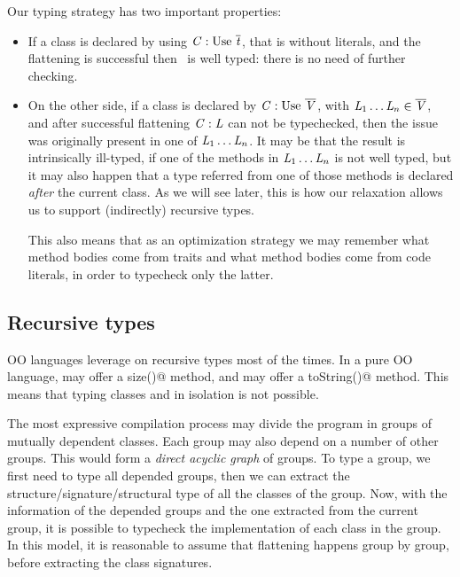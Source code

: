 Our typing strategy has two important properties:
\begin{itemize}
\item If a class is declared by using $\mC : \use\ \overline\mt$, that is without literals,
and the flattening is successful then \mC\ is well typed: there is no need of further checking.
\item On the other side, if a class is declared by $\mC : \use\ \overline\mV$, with
$\mathit{L}_1\ldots\mathit{L}_n \in \overline{\mathit{V}}$, and after successful flattening $\mathit{C} : \mathit{L}$ can not be typechecked,
then the issue was originally present in one of $\mathit{L}_1\ldots\mathit{L}_n$.
It may be that the result is intrinsically ill-typed, if one of the methods in $\mathit{L}_1\ldots\mathit{L}_n$ is not well typed,
but it may also happen that a type referred from one of those methods
is declared \emph{after} the current class. As we will see later, this
is how our relaxation allows us to support (indirectly) recursive types.

This also means that as an optimization strategy
 we may remember what method bodies come from traits and what method bodies come from code literals, in order to typecheck only the latter.
 \end{itemize}

 \subsection{Recursive types}

OO languages leverage on recursive types most of the times.
In a pure OO language, \Q@String@ may offer a \Q@Int size()@
method, and \Q@Int@ may offer a \Q@String toString()@ method.
This means that typing classes 
\Q@String@ and \Q@Int@ in isolation is not possible.

The most expressive compilation process may divide the program in groups of mutually 
dependent classes.
Each group may also depend on a number of other groups.
This would form a \emph{direct acyclic graph} of groups.
To type a group, we first need to type all depended groups, then
we can extract the structure/signature/structural type of all
the classes of the group.
Now, with the information of the depended groups and the one extracted
from the current group, it is possible to typecheck the implementation
 of each class in the group.
In this model, it is reasonable to assume that flattening happens group by group, before
extracting the class signatures.

